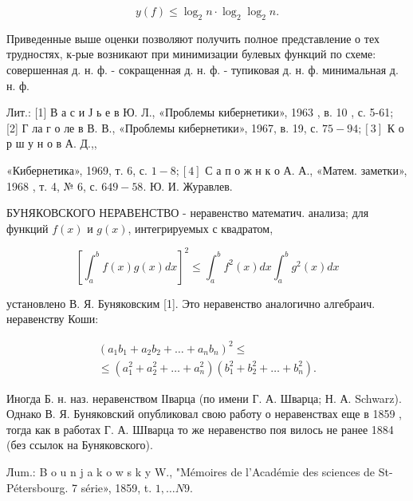 \documentclass[10pt]{article}
\begin{document}
\[

y(f) \leqslant \log _{2} n \cdot \log _{2} \log _{2} n .

\]



Приведенные выше оценки позволяют получить полное представление о тех трудностях, к-рые возникают при минимизации булевых функций по схеме: совершенная д. н. ф. - сокращенная д. н. ф. - тупиковая д. н. ф. минимальная д. н. ф.



Лит.: [1] В а с и Ј ь е в Ю. Л., «Проблемы кибернетики», 1963 , в. 10 , с. 5-61; [2] Г ла г о ле в В. В., «Проблемы кибернетики», 1967, в. 19, с. $75-94 ;[3]$ К о р ш у н о в А. Д.,,

«Кибернетика», 1969, т. 6, с. $1-8 ;[4]$ С а п о ж н к о А. А., «Матем. заметки», 1968 , т. 4, № 6, с. $649-58$. Ю. И. Журавлев.



БУНЯКОВСКОГО НЕРАВЕНСТВО - неравенство математич. анализа; для функций $f(x)$ и $g(x)$, интегрируемых с квадратом,



\[

\left[\int_{a}^{b} f(x) g(x) d x\right]^{2} \leqslant \int_{a}^{b} f^{2}(x) d x \int_{a}^{b} g^{2}(x) d x

\]



установлено В. Я. Буняковским [1]. Это неравенство аналогично алгебраич. неравенству Коши:



\[

\begin{gathered}

\left(a_{1} b_{1}+a_{2} b_{2}+\ldots+a_{n} b_{n}\right)^{2} \leqslant \\

\leqslant\left(a_{1}^{2}+a_{2}^{2}+\ldots+a_{n}^{2}\right)\left(b_{1}^{2}+b_{2}^{2}+\ldots+b_{n}^{2}\right) .

\end{gathered}

\]



Иногда Б. н. наз. неравенством ІІварца (по имени Г. А. Шварца; Н. А. Schwarz). Однако В. Я. Буняковский опубликовал свою работу о неравенствах еще в 1859 , тогда как в работах Г. А. ШІварца то же неравенство поя вилось не ранее 1884 (без ссылок на Буняковского).



Лum.: B o u n j a k o w s k y W., "Mémoires de l'Académie des sciences de St-Pétersbourg. 7 série», 1859, t. $1, \ldots N 9$.
\end{document}
